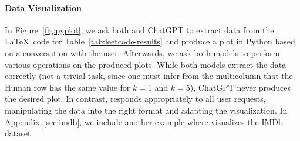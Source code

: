 \paragraph{Data Visualization} %
In Figure~\ref{fig:pyplot}, we ask both \DV{} and ChatGPT to extract data from the \LaTeX\ code for Table~\ref{tab:leetcode-results} and produce a plot in Python based on a conversation with the user. Afterwards, we ask both models to perform various operations on the produced plots. While both models extract the data correctly (not a trivial task, since one must infer from the multicolumn that the Human row has the same value for $k=1$ and $k=5$), ChatGPT never produces the desired plot. In contrast, \DV{} responds appropriately to all user requests, manipulating the data into the right format and adapting the visualization. In Appendix~\ref{sec:imdb}, we include another example where \DV visualizes the IMDb dataset.
